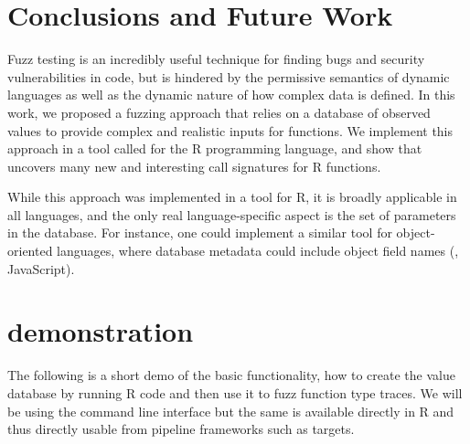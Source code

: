 \documentclass[sigplan,anonymous,review]{acmart}
\begin{document}
\section{Conclusions and Future Work}
\label{sec:conclusions}

Fuzz testing is an incredibly useful technique for finding bugs and security vulnerabilities in code, but is hindered by the permissive semantics of dynamic languages as well as the dynamic nature of how complex data is defined.
In this work, we proposed a fuzzing approach that relies on a database of observed values to provide complex and realistic inputs for functions.
We implement this approach in a tool called \tool for the R programming language, and show that \tool uncovers many new and interesting call signatures for R functions.

While this approach was implemented in a tool for R, it is broadly applicable in all languages, and the only real language-specific aspect is the set of parameters in the database.
For instance, one could implement a similar tool for object-oriented languages, where database metadata could include object field names (\Eg, JavaScript).




\appendix

\section{\tool demonstration}\label{sec:demo}

The following is a short demo of the basic \tool functionality, \Ie how to create the value database by running R code and then use it to fuzz function type traces.
We will be using the command line interface but the same is available directly in R and thus directly usable from pipeline frameworks such as targets.

\end{document}
